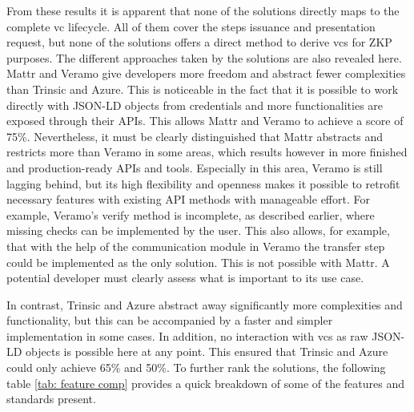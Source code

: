    From these results it is apparent that none of the solutions directly maps to the complete \ac{vc} lifecycle. All of them cover the steps issuance and presentation request, but none of the solutions offers a direct method to derive \acp{vc} for \ac{ZKP} purposes. The different approaches taken by the solutions are also revealed here. Mattr and Veramo give developers more freedom and abstract fewer complexities than Trinsic and Azure. This is noticeable in the fact that it is possible to work directly with JSON-LD objects from credentials and more functionalities are exposed through their APIs. This allows Mattr and Veramo to achieve a score of 75\%. Nevertheless, it must be clearly distinguished that Mattr abstracts and restricts more than Veramo in some areas, which results however in more finished and production-ready APIs and tools. Especially in this area, Veramo is still lagging behind, but its high flexibility and openness makes it possible to retrofit necessary features with existing API methods with manageable effort. For example, Veramo's verify method is incomplete, as described earlier, where missing checks can be implemented by the user. This also allows, for example, that with the help of the communication module in Veramo the transfer step could be implemented as the only solution. This is not possible with Mattr. A potential developer must clearly assess what is important to its use case.
    
    In contrast, Trinsic and Azure abstract away significantly more complexities and functionality, but this can be accompanied by a faster and simpler implementation in some cases. In addition, no interaction with \acp{vc} as raw JSON-LD objects is possible here at any point. This ensured that Trinsic and Azure could only achieve 65\% and 50\%. To further rank the solutions, the following table \ref{tab: feature comp} provides a quick breakdown of some of the features and standards present.

